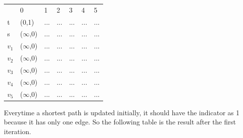 \documentclass[a4paper,11pt]{article}
\begin{document}
\begin{enumerate}
\begin{center}
\begin{tabular}{lllllll}
                       & 0                         & 1                     & 2                     & 3                     & 4                     & 5                     \\ \cline{2-7} 
\multicolumn{1}{l|}{t} & \multicolumn{1}{l|}{(0,1)} & \multicolumn{1}{l|}{...} & \multicolumn{1}{l|}{...} & \multicolumn{1}{l|}{...} & \multicolumn{1}{l|}{...} & \multicolumn{1}{l|}{...} \\ \cline{2-7} 
\multicolumn{1}{l|}{s} & \multicolumn{1}{l|}{($\infty$,0)} & \multicolumn{1}{l|}{...} & \multicolumn{1}{l|}{...} & \multicolumn{1}{l|}{...} & \multicolumn{1}{l|}{...} & \multicolumn{1}{l|}{...} \\ \cline{2-7} 
\multicolumn{1}{l|}{$v_1$} & \multicolumn{1}{l|}{($\infty$,0)} & \multicolumn{1}{l|}{...} & \multicolumn{1}{l|}{...} & \multicolumn{1}{l|}{...} & \multicolumn{1}{l|}{...} & \multicolumn{1}{l|}{...} \\ \cline{2-7} 
\multicolumn{1}{l|}{$v_2$} & \multicolumn{1}{l|}{($\infty$,0)} & \multicolumn{1}{l|}{...} & \multicolumn{1}{l|}{...} & \multicolumn{1}{l|}{...} & \multicolumn{1}{l|}{...} & \multicolumn{1}{l|}{...} \\ \cline{2-7} 
\multicolumn{1}{l|}{$v_3$} & \multicolumn{1}{l|}{($\infty$,0)} & \multicolumn{1}{l|}{...} & \multicolumn{1}{l|}{...} & \multicolumn{1}{l|}{...} & \multicolumn{1}{l|}{...} & \multicolumn{1}{l|}{...} \\ \cline{2-7} 
\multicolumn{1}{l|}{$v_4$} & \multicolumn{1}{l|}{($\infty$,0)} & \multicolumn{1}{l|}{...} & \multicolumn{1}{l|}{...} & \multicolumn{1}{l|}{...} & \multicolumn{1}{l|}{...} & \multicolumn{1}{l|}{...} \\ \cline{2-7} 
\multicolumn{1}{l|}{$v_5$} & \multicolumn{1}{l|}{($\infty$,0)} & \multicolumn{1}{l|}{...} & \multicolumn{1}{l|}{...} & \multicolumn{1}{l|}{...} & \multicolumn{1}{l|}{...} & \multicolumn{1}{l|}{...} \\ \cline{2-7} 
\end{tabular}
\end{center}

Everytime a shortest path is updated initially, it should have the indicator as 1 because it has only one edge. So the following table is the result after the first iteration.


\end{enumerate}
\end{document}
